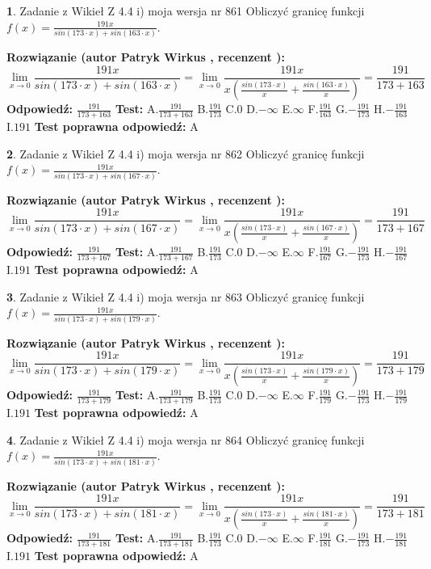 \documentclass[12pt, a4paper]{article}
\theoremstyle{definition} %
\newtheorem{zad}{}
\newcommand{\zadStart}[1]{\begin{zad}#1\newline}
\newcommand{\zadStop}{\end{zad}}
\newcommand{\rozwStart}[2]{\noindent \textbf{Rozwiązanie (autor #1 , recenzent #2): }\newline}
\newcommand{\rozwStop}{\newline}
\newcommand{\odpStart}{\noindent \textbf{Odpowiedź:}\newline}
\newcommand{\odpStop}{\newline}
\newcommand{\testStart}{\noindent \textbf{Test:}\newline}
\newcommand{\testStop}{\newline}
\newcommand{\kluczStart}{\noindent \textbf{Test poprawna odpowiedź:}\newline}
\newcommand{\kluczStop}{\newline}
\begin{document}
\zadStart{Zadanie z Wikieł Z 4.4 i) moja wersja nr 861}
Obliczyć granicę funkcji $f(x)=\frac{191x}{sin(173\cdot x) +sin(163\cdot x)}$.
\zadStop
\rozwStart{Patryk Wirkus}{}
$$\lim\limits_{x\to 0}\frac{191x}{sin(173\cdot x) +sin(163\cdot x)}=\lim\limits_{x\to 0}\frac{191x}{x(\frac{sin(173\cdot x)}{x}+\frac{sin(163\cdot x)}{x})}=\frac{191}{173+163}$$
\rozwStop
\odpStart
$\frac{191}{173+163}$
\odpStop
\testStart
A.$\frac{191}{173+163}$
B.$\frac{191}{173}$
C.$0$
D.$-\infty$
E.$\infty$
F.$\frac{191}{163}$
G.$-\frac{191}{173}$
H.$-\frac{191}{163}$
I.$191$
\testStop
\kluczStart
A
\kluczStop



\zadStart{Zadanie z Wikieł Z 4.4 i) moja wersja nr 862}
Obliczyć granicę funkcji $f(x)=\frac{191x}{sin(173\cdot x) +sin(167\cdot x)}$.
\zadStop
\rozwStart{Patryk Wirkus}{}
$$\lim\limits_{x\to 0}\frac{191x}{sin(173\cdot x) +sin(167\cdot x)}=\lim\limits_{x\to 0}\frac{191x}{x(\frac{sin(173\cdot x)}{x}+\frac{sin(167\cdot x)}{x})}=\frac{191}{173+167}$$
\rozwStop
\odpStart
$\frac{191}{173+167}$
\odpStop
\testStart
A.$\frac{191}{173+167}$
B.$\frac{191}{173}$
C.$0$
D.$-\infty$
E.$\infty$
F.$\frac{191}{167}$
G.$-\frac{191}{173}$
H.$-\frac{191}{167}$
I.$191$
\testStop
\kluczStart
A
\kluczStop



\zadStart{Zadanie z Wikieł Z 4.4 i) moja wersja nr 863}
Obliczyć granicę funkcji $f(x)=\frac{191x}{sin(173\cdot x) +sin(179\cdot x)}$.
\zadStop
\rozwStart{Patryk Wirkus}{}
$$\lim\limits_{x\to 0}\frac{191x}{sin(173\cdot x) +sin(179\cdot x)}=\lim\limits_{x\to 0}\frac{191x}{x(\frac{sin(173\cdot x)}{x}+\frac{sin(179\cdot x)}{x})}=\frac{191}{173+179}$$
\rozwStop
\odpStart
$\frac{191}{173+179}$
\odpStop
\testStart
A.$\frac{191}{173+179}$
B.$\frac{191}{173}$
C.$0$
D.$-\infty$
E.$\infty$
F.$\frac{191}{179}$
G.$-\frac{191}{173}$
H.$-\frac{191}{179}$
I.$191$
\testStop
\kluczStart
A
\kluczStop



\zadStart{Zadanie z Wikieł Z 4.4 i) moja wersja nr 864}
Obliczyć granicę funkcji $f(x)=\frac{191x}{sin(173\cdot x) +sin(181\cdot x)}$.
\zadStop
\rozwStart{Patryk Wirkus}{}
$$\lim\limits_{x\to 0}\frac{191x}{sin(173\cdot x) +sin(181\cdot x)}=\lim\limits_{x\to 0}\frac{191x}{x(\frac{sin(173\cdot x)}{x}+\frac{sin(181\cdot x)}{x})}=\frac{191}{173+181}$$
\rozwStop
\odpStart
$\frac{191}{173+181}$
\odpStop
\testStart
A.$\frac{191}{173+181}$
B.$\frac{191}{173}$
C.$0$
D.$-\infty$
E.$\infty$
F.$\frac{191}{181}$
G.$-\frac{191}{173}$
H.$-\frac{191}{181}$
I.$191$
\testStop
\kluczStart
A
\kluczStop
\end{document}
